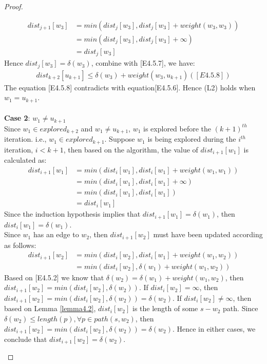 \begin{proof}
\begin{itemize}
\begin{enumerate}
\begin{align*}
    dist_{j+1}[w_3] &= min(dist_j[w_3], dist_j[w_3] + weight(w_3, w_3)) \\
                   &= min(dist_j[w_3], dist_j[w_3] + \infty) \\
                   &= dist_j[w_3]
  \end{align*}
  Hence $dist_j[w_3] = \delta(w_3)$, combine with [E4.5.7], we have: 
  \begin{align*}
    dist_{k+2}[u_{k+1}] \leq \delta(w_3) + weight(w_3, u_{k+1}) ([E4.5.8])
  \end{align*}
  The equation [E4.5.8] contradicts with equation[E4.5.6]. Hence (L2) holds when $w_1 = u_{k+1}$. 
  \\\\

  \textbf{Case 2}: $w_1 \neq u_{k+1}$
  \\ 
  Since $w_1 \in explored_{k+2}$ and $w_1 \neq u_{k+1}$, $w_1$ is explored before the $(k+1)^{th}$ iteration. i.e., $w_1 \in explored_{k+1}$. Suppose $w_1$ is being explored during the $i^{th}$ iteration, $i < k+1$, then based on the algorithm, the value of $dist_{i+1}[w_1]$ is calculated as: 
  \begin{align*}
        dist_{i+1}[w_1] &= min(dist_{i}[w_1], dist_{i}[w_1] + weight(w_1,w_1)) \\
                        &= min(dist_{i}[w_1], dist_{i}[w_1] + \infty)\\
                        &= min(dist_{i}[w_1], dist_{i}[w_1])\\
                        &= dist_{i}[w_1]
  \end{align*}
  Since the induction hypothesis implies that $dist_{i+1}[w_1] = \delta(w_1)$, then $dist_i[w_1] = \delta(w_1)$. 
  \\
  Since $w_1$ has an edge to $w_2$, then $dist_{i+1}[w_2]$ must have been updated according as follows: 
  \begin{align*}
     dist_{i+1}[w_2] &= min(dist_i[w_2], dist_i[w_1] + weight(w_1,w_2)) \\
                     &= min(dist_i[w_2], \delta(w_1) + weight(w_1, w_2))
  \end{align*}
  Based on [E4.5.2] we know that $\delta(w_2) =  \delta(w_1) + weight(w_1, w_2)$, then $dist_{i+1}[w_2] = min(dist_i[w_2], \delta(w_2))$. If $dist_i[w_2] = \infty$, then $dist_{i+1}[w_2] = min(dist_i[w_2], \delta(w_2)) = \delta(w_2)$. If $dist_i[w_2] \neq \infty$, then based on Lemma \ref{lemma4.2}, $dist_i[w_2]$ is the length of some $s-w_2$ path. Since $\delta(w_2) \leq length(p), \forall p \in path(s, w_2)$, then $dist_{i+1}[w_2] = min(dist_i[w_2], \delta(w_2)) = \delta(w_2)$. Hence in either cases, we conclude that $dist_{i+1}[w_2] = \delta(w_2)$. 

\end{enumerate}
\end{itemize}
\end{proof}
